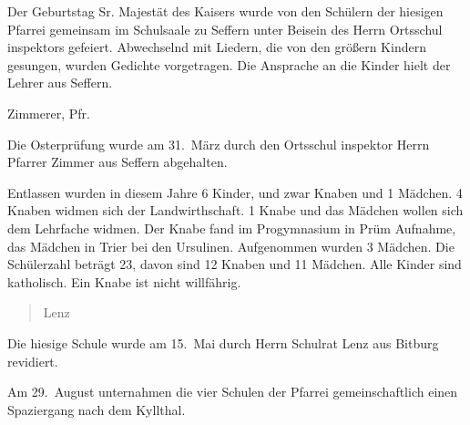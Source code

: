 

\pstart
Der Geburtstag Sr. Majestät des Kaisers wurde von den Schülern der hiesigen Pfarrei\ob
gemeinsam im Schulsaale zu Seffern unter Beisein des Herrn Ortsschul\ohb
inspektors gefeiert. Abwechselnd mit Liedern, die von den größern Kindern\ob
gesungen, wurden Gedichte vorgetragen. Die Ansprache an die Kinder\ob
hielt der Lehrer aus Seffern.

\pend
{}
\pstart

Zimmerer, Pfr.

\pend
{}
\pstart

Die Osterprüfung wurde am 31.\ März durch den Ortsschul\ohb
inspektor Herrn Pfarrer Zimmer aus Seffern abgehalten.

\pend
{}
\pstart

Entlassen wurden in diesem Jahre 6 Kinder, und zwar Knaben und 1 Mädchen. 4 Knaben widmen sich der\ob
Landwirthschaft. 1 Knabe und das Mädchen wollen sich dem\ob
Lehrfache widmen. Der Knabe fand im Progymnasium in Prüm\ob
Aufnahme, das Mädchen in Trier bei den Ursulinen.\ob
Aufgenommen wurden 3 Mädchen. Die Schülerzahl\ob
beträgt 23, davon sind 12 Knaben und 11 Mädchen. Alle Kinder\ob
sind katholisch. Ein Knabe ist nicht willfährig.

\pend
{}
\pstart


\pend
\begin{verse}
Lenz
\end{verse}
\pstart

\pend
{}
\pstart

Die hiesige Schule wurde am 15.\ Mai durch Herrn Schulrat Lenz aus\ob
Bitburg revidiert.

\pend
{}
\pstart

Am 29.\ August unternahmen die vier Schulen der Pfarrei\ob
gemeinschaftlich einen Spaziergang nach dem Kyllthal.
\pend
